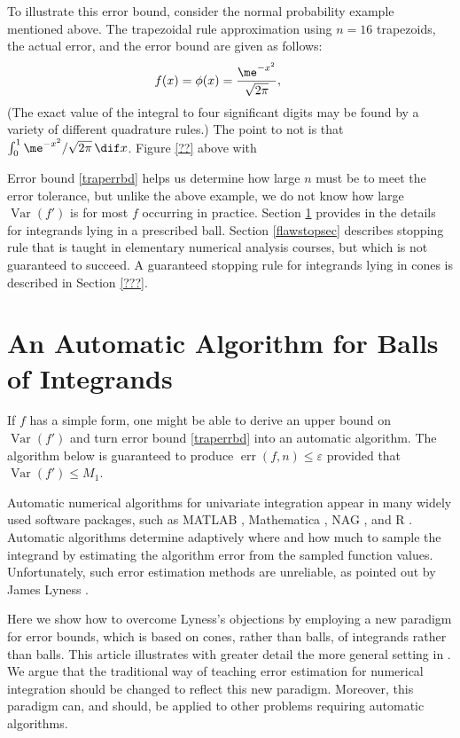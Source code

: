 \documentclass[]{amsart}
\DeclareMathOperator{\Var}{Var}
\DeclareMathOperator{\err}{err}
\theoremstyle{definition}
\theoremstyle{remark}
\begin{document}
To illustrate this error bound, consider the normal probability example mentioned above.  The trapezoidal rule approximation using $n=16$ trapezoids, the actual error, and the error bound are given as follows:
\[
f(x) = \phi(x) = \frac{\me^{-x^2}}{\sqrt{2 \pi}}, \qquad
\]
(The exact value of the integral to four significant digits may be found by a variety of different quadrature rules.)  The point to not is that $\int_0^1 \me^{-x^2}/\sqrt{2 \pi} \, \dif x$.  Figure \ref{??}  above with 

Error bound \eqref{traperrbd} helps us determine how large $n$ must be to meet the error tolerance, but unlike the above example, we do not know how large $\Var(f')$ is for most $f$ occurring in practice. Section \ref{autoballsec} provides in the details for integrands lying in a prescribed ball.  Section \ref{flawstopsec} describes stopping rule that is taught in elementary numerical analysis courses, but which is not guaranteed to succeed.  A guaranteed stopping rule for integrands lying in cones is described in Section \ref{???}.


\section{An Automatic Algorithm for Balls of Integrands} \label{autoballsec}

If $f$ has a simple form, one might be able to derive an upper bound on $\Var(f')$ and turn error bound \eqref{traperrbd} into an automatic algorithm.  The algorithm below is guaranteed to produce $\err(f,n)\le \varepsilon$ provided that $\Var(f') \le M_1$.  

Automatic numerical algorithms for univariate integration appear in many widely used software packages, such as MATLAB , Mathematica , NAG , and R .  Automatic algorithms determine adaptively where and how much to sample the integrand by estimating the algorithm error from the sampled function values.  Unfortunately, such error estimation methods are unreliable, as pointed out by James Lyness .

Here we show how to overcome Lyness's objections by employing a new paradigm for error bounds, which is based on cones, rather than balls, of integrands rather than balls.  This article illustrates with greater detail the more general setting in .  We argue that the traditional way of teaching error estimation for numerical integration should be changed to reflect this new paradigm.  Moreover, this paradigm can, and should, be applied to other problems requiring automatic algorithms. 
\end{document}

